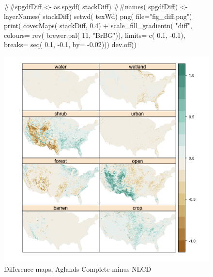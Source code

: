 \begin{figure} 
\begin{center} 

\begin{Schunk}
\begin{Sinput}
 ##spgdfDiff <- as.spgdf( stackDiff)
 ##names( spgdfDiff) <- layerNames( stackDiff)
 setwd( texWd)
 png( file="fig_diff.png")
 print( coverMaps( stackDiff, 0.4) + 
       scale_fill_gradientn( "diff", colours= rev( brewer.pal( 11, "BrBG")), 
                            limits= c( 0.1, -0.1),
                            breaks= seq( 0.1, -0.1, by= -0.02)))
 dev.off()
\end{Sinput}
\end{Schunk}

\includegraphics{fig_diff}
\end{center} 
\caption{Difference maps, Aglands Complete minus NLCD} 
\label{fig:diff} 
\end{figure} 

